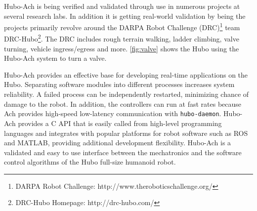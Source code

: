 
Hubo-Ach is being verified and validated through use in numerous projects at several research labs.
In addition it is getting real-world validation by being the projects primarily revolve around the DARPA Robot Challenge
(DRC)\footnote{DARPA Robot Challenge:
  http://www.theroboticschallenge.org/} team
DRC-Hubo\footnote{DRC-Hubo Homepage: http://drc-hubo.com/}.  The DRC
includes rough terrain walking, ladder climbing, valve turning,
vehicle ingress/egress and more.  \autoref{fig:valve} shows the Hubo
using the Hubo-Ach system to turn a valve.


Hubo-Ach provides an effective base for developing real-time
applications on the Hubo.  Separating software modules into different
processes increases system reliability.  A failed process can be
independently restarted, minimizing chance of damage to the robot.  In
addition, the controllers can run at fast rates because Ach provides
high-speed low-latency communication with {\tt hubo-daemon}.  Hubo-Ach
provides a C API that is easily called from high-level programming
languages and integrates with popular platforms for robot software
such as ROS and MATLAB, providing additional development flexibility.
Hubo-Ach is a validated and easy to use interface between the
mechatronics and the software control algorithms of the Hubo full-size
humanoid robot.


